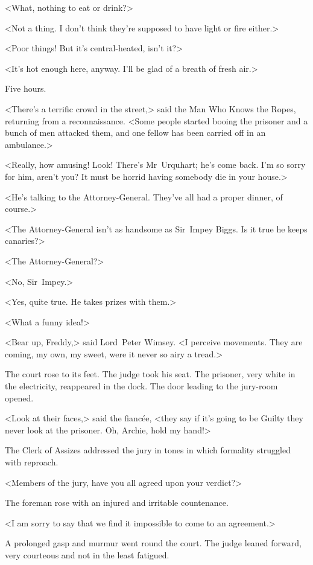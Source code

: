 <What, nothing to eat or drink?>

<Not a thing. I don't think they're supposed to have light or fire either.>

<Poor things! But it's central-heated, isn't it?>

<It's hot enough here, anyway. I'll be glad of a breath of fresh air.>

Five hours.

<There's a terrific crowd in the street,> said the Man Who Knows the Ropes, returning from a reconnaissance. <Some people started booing the prisoner and a bunch of men attacked them, and one fellow has been carried off in an ambulance.>

<Really, how amusing! Look! There's Mr~Urquhart; he's come back. I'm so sorry for him, aren't you? It must be horrid having somebody die in your house.>

<He's talking to the Attorney-General. They've all had a proper dinner, of course.>

<The Attorney-General isn't as handsome as Sir~Impey Biggs. Is it true he keeps canaries?>

<The Attorney-General?>

<No, Sir~Impey.>

<Yes, quite true. He takes prizes with them.>

<What a funny idea!>

<Bear up, Freddy,> said Lord~Peter Wimsey. <I perceive movements. They are coming, my own, my sweet, were it never so airy a tread.>

The court rose to its feet. The judge took his seat. The prisoner, very white in the electricity, reappeared in the dock. The door leading to the jury-room opened.

<Look at their faces,> said the fiancée, <they say if it's going to be Guilty they never look at the prisoner. Oh, Archie, hold my hand!>

The Clerk of Assizes addressed the jury in tones in which formality struggled with reproach.

<Members of the jury, have you all agreed upon your verdict?>

The foreman rose with an injured and irritable countenance.

<I am sorry to say that we find it impossible to come to an agreement.>

A prolonged gasp and murmur went round the court. The judge leaned forward, very courteous and not in the least fatigued.

